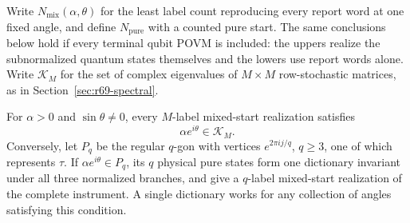 Write $N_{\mathrm{mix}}(\alpha,\theta)$ for the least label count
reproducing every report word at one fixed angle, and define
$N_{\mathrm{pure}}$ with a counted pure start.  The same conclusions below
hold if every terminal qubit POVM is included: the uppers realize the
subnormalized quantum states themselves and the lowers use report words
alone.
Write $\mathcal K_M$ for the set of complex eigenvalues of $M\times M$
row-stochastic matrices, as in Section~\ref{sec:r69-spectral}.

\begin{lemma}
\label{lem:r75-full-instrument-bounds}
For $\alpha>0$ and $\sin\theta\ne0$, every $M$-label mixed-start
realization satisfies
\begin{equation}\label{eq:r75-cylinder-spectrum}
 \alpha e^{i\theta}\in\mathcal K_M.
\end{equation}
Conversely, let $P_q$ be the regular $q$-gon with vertices
$e^{2\pi i j/q}$, $q\ge3$, one of which represents $\tau$.  If
$\alpha e^{i\theta}\in P_q$, its $q$ physical pure states form one
dictionary invariant under all three normalized branches, and give a
$q$-label mixed-start realization of the complete instrument.  A single
dictionary works for any collection of angles satisfying this condition.
\end{lemma}

